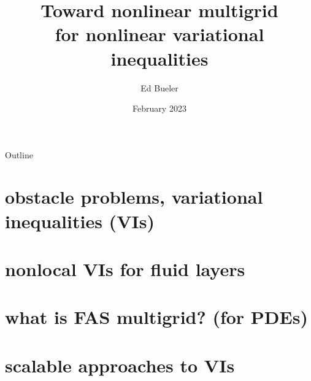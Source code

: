 \documentclass[svgnames,
               hyperref={colorlinks,citecolor=DeepPink4,linkcolor=FireBrick,urlcolor=Maroon},
               usepdftitle=false]  %
               {beamer}
\title[Multigrid for nonlinear VI]{Toward nonlinear multigrid \\ for nonlinear variational inequalities}
\author{Ed Bueler}
\institute[UAF]{University of Alaska Fairbanks}
\date[]{February 2023}
\begin{document}
\beamertemplatenavigationsymbolsempty


{
  \begin{frame}
    \titlepage
  \end{frame}
}

\begin{frame}{Outline}
  \tableofcontents[hideallsubsections]
\end{frame}


\section{obstacle problems, variational inequalities (VIs)}

\section{nonlocal VIs for fluid layers}

\section{what is FAS multigrid?  (for PDEs)}

\section{scalable approaches to VIs}
\end{document}
